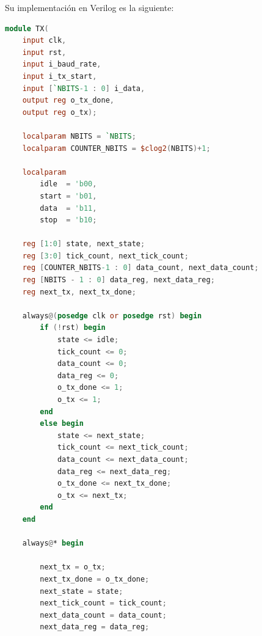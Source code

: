 \documentclass{article}
\begin{document}
Su implementación en Verilog es la siguiente:

\begin{lstlisting}[language=Verilog]
module TX(
    input clk,
    input rst,
    input i_baud_rate,
    input i_tx_start,
    input [`NBITS-1 : 0] i_data,
    output reg o_tx_done,
    output reg o_tx);

    localparam NBITS = `NBITS;
    localparam COUNTER_NBITS = $clog2(NBITS)+1;

    localparam
        idle  = 'b00,
        start = 'b01,
        data  = 'b11,
        stop  = 'b10;

    reg [1:0] state, next_state;
    reg [3:0] tick_count, next_tick_count;
    reg [COUNTER_NBITS-1 : 0] data_count, next_data_count;
    reg [NBITS - 1 : 0] data_reg, next_data_reg;
    reg next_tx, next_tx_done;

    always@(posedge clk or posedge rst) begin
        if (!rst) begin
            state <= idle;
            tick_count <= 0;
            data_count <= 0;
            data_reg <= 0;
            o_tx_done <= 1;
            o_tx <= 1;
        end
        else begin
            state <= next_state;
            tick_count <= next_tick_count;
            data_count <= next_data_count;
            data_reg <= next_data_reg;
            o_tx_done <= next_tx_done;
            o_tx <= next_tx;
        end
    end

    always@* begin

        next_tx = o_tx;
        next_tx_done = o_tx_done;
        next_state = state;
        next_tick_count = tick_count;
        next_data_count = data_count;
        next_data_reg = data_reg;


\end{lstlisting}
\end{document}
